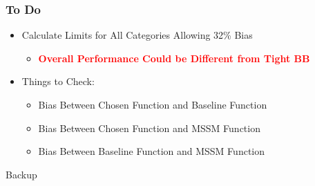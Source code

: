 \documentclass{beamer}
\newcommand{\tredbf}[1]{\textcolor{red}{\bf #1}}
\begin{document}
\begin{frame}
\frametitle{To Do}
  \begin{itemize}
  \item Calculate Limits for All Categories Allowing 32\% Bias
    \begin{itemize}
      \item \tredbf{Overall Performance Could be Different from Tight BB}
    \end{itemize}
  \item Things to Check:
    \begin{itemize}
      \item Bias Between Chosen Function and Baseline Function
      \item Bias Between Chosen Function and MSSM Function
      \item Bias Between Baseline Function and MSSM Function
    \end{itemize}
  \end{itemize}
\begin{center}
\end{center}
\end{frame}

\begin{frame}
  \begin{center}
    \Huge
    Backup
  \end{center}
\end{frame}

\end{document}
